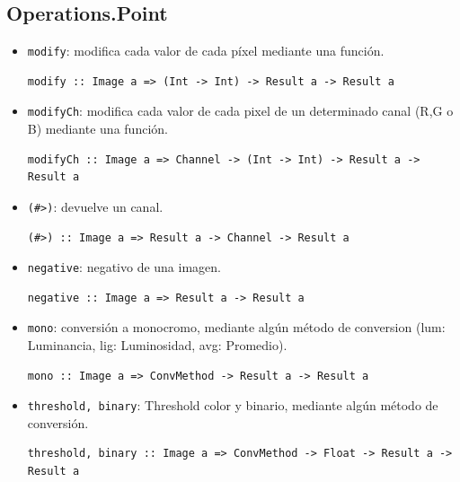 \documentclass[a4paper, 11pt]{article} %
\begin{document}

\subsection*{Operations.Point}
	\begin{itemize} 
		\item \texttt{modify}: modifica cada valor de cada píxel mediante una función.
\begin{lstlisting} 
modify :: Image a => (Int -> Int) -> Result a -> Result a
\end{lstlisting}
		\item \texttt{modifyCh}: modifica cada valor de cada pixel de un determinado canal (R,G o B) mediante una función.
\begin{lstlisting} 
modifyCh :: Image a => Channel -> (Int -> Int) -> Result a -> Result a
\end{lstlisting}
		\item \texttt{(\#>)}: devuelve un canal.
\begin{lstlisting} 
(#>) :: Image a => Result a -> Channel -> Result a
\end{lstlisting}
		\item \texttt{negative}: negativo de una imagen.
\begin{lstlisting} 
negative :: Image a => Result a -> Result a
\end{lstlisting}
		\item \texttt{mono}: conversión a monocromo, mediante algún método de conversion (lum: Luminancia, lig: Luminosidad, avg: Promedio).
\begin{lstlisting} 
mono :: Image a => ConvMethod -> Result a -> Result a
\end{lstlisting}
		\item \texttt{threshold, binary}: Threshold color y binario, mediante algún método de conversión.
\begin{lstlisting} 
threshold, binary :: Image a => ConvMethod -> Float -> Result a -> Result a
\end{lstlisting}

	\end{itemize}	

\end{document}
